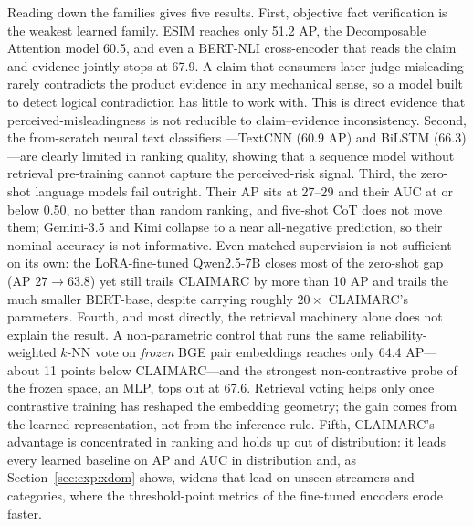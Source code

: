 \documentclass[11pt]{article}
\begin{document}
Reading down the families gives five results. First, objective fact verification
is the weakest learned family. ESIM reaches only 51.2 AP, the Decomposable
Attention model 60.5, and even a BERT-NLI cross-encoder that reads the claim and
evidence jointly stops at 67.9. A claim that consumers
later judge misleading rarely contradicts the product evidence in any mechanical
sense, so a model built to detect logical contradiction has little to work with.
This is direct evidence that perceived-misleadingness is not reducible to
claim--evidence inconsistency. Second, the from-scratch neural text classifiers
---TextCNN (60.9 AP) and BiLSTM (66.3)---are clearly limited in ranking quality,
showing that a sequence model without retrieval pre-training cannot capture the
perceived-risk signal. Third, the zero-shot language models fail outright. Their AP
sits at 27--29 and their AUC at or below 0.50, no better than random ranking, and
five-shot CoT does not move them; Gemini-3.5 and Kimi collapse to a near
all-negative prediction, so their nominal accuracy is not informative. Even
matched supervision is not sufficient on its own: the LoRA-fine-tuned Qwen2.5-7B
closes most of the zero-shot gap (AP $27\to63.8$) yet still trails CLAIMARC by
more than 10 AP and trails the much smaller BERT-base, despite carrying roughly
$20\times$ CLAIMARC's parameters. Fourth, and most directly, the retrieval
machinery alone does not explain the result. A non-parametric control that runs
the same reliability-weighted $k$-NN vote on \emph{frozen}
BGE pair embeddings reaches only 64.4 AP---about 11 points below CLAIMARC---and
the strongest non-contrastive probe of the frozen space, an MLP, tops out at 67.6.
Retrieval voting helps only once contrastive training has
reshaped the embedding geometry; the gain comes from the learned representation,
not from the inference rule. Fifth, CLAIMARC's advantage is concentrated in
ranking and holds up out of distribution: it leads every learned baseline on AP
and AUC in distribution and, as Section~\ref{sec:exp:xdom} shows, widens that
lead on unseen streamers and categories, where the threshold-point metrics of the
fine-tuned encoders erode faster.
\end{document}
